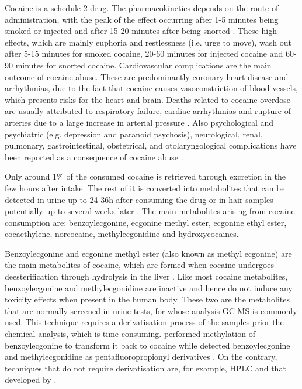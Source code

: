 Cocaine is a schedule 2 drug. 
%
The pharmacokinetics depends on the route of administration, with the peak of the effect occurring after 1-5 minutes being smoked or injected and after 15-20 minutes after being snorted  \cite{lange2001cardiovascular}.
%
These high effects, which are mainly euphoria and restlessness (i.e. urge to move), wash out after 5-15 minutes for smoked cocaine, 20-60 minutes for injected cocaine and 60-90 minutes for snorted cocaine.
%
%
Cardiovascular complications are the main outcome of cocaine abuse.
%
These are predominantly coronary heart disease and arrhythmias, due to the fact that cocaine causes vasoconstriction of blood vessels, which presents risks for the heart and brain.
%
Deaths related to cocaine overdose are usually attributed to respiratory failure, cardiac arrhythmias and rupture of arteries due to a large increase in arterial pressure \cite{lange2001cardiovascular,cregler1986medical}.
%
Also psychological and psychiatric (e.g. depression and paranoid psychosis), neurological, renal, pulmonary, gastrointestinal, obstetrical, and otolaryngological complications have been reported as a consequence of cocaine abuse \cite{glauser2007overview}.
%




Only around 1\% of the consumed cocaine is retrieved through excretion in the few hours after intake.
%
The rest of it is converted into %
metabolites that can be detected in urine up to 24-36h after consuming the drug or in hair samples potentially up to several weeks later \cite{cone1991testing}. 
%
The main metabolites arising from cocaine consumption are: 
benzoylecgonine, 
ecgonine methyl ester, 
ecgonine ethyl ester, 
cocaethylene,
norcocaine,
methylecgonidine and 
hydroxycocaines.


Benzoylecgonine and %
ecgonine methyl ester (also known as methyl ecgonine)
are the main metabolites of cocaine, which  are formed when cocaine undergoes deesterification through hydrolysis in the liver \cite{shimomura2019cocaine}.
%
Like most cocaine metabolites, benzoylecgonine and methylecgonidine are inactive and hence do not induce any toxicity effects when present in the human body.
%
These two are the metabolites that are normally screened in urine tests, for whose analysis GC-MS is commonly used. This technique requires a derivatisation process of the samples prior the chemical analysis, which is time-consuming.
\citeauthor{ambre1988urinary}  performed methylation of benzoylecgonine to transform it back to cocaine 
while
\citeauthor{fleming2010quantitation} detected benzoylecgonine and methylecgonidine as pentafluoropropionyl derivatives
\cite{ambre1988urinary,fleming2010quantitation}.
%
On the contrary, techniques that do not require derivatisation are, for example, HPLC and that developed by  \citeauthor{hezinova2012simultaneous}  
\cite{antonilli2001analysis,hezinova2012simultaneous}.

